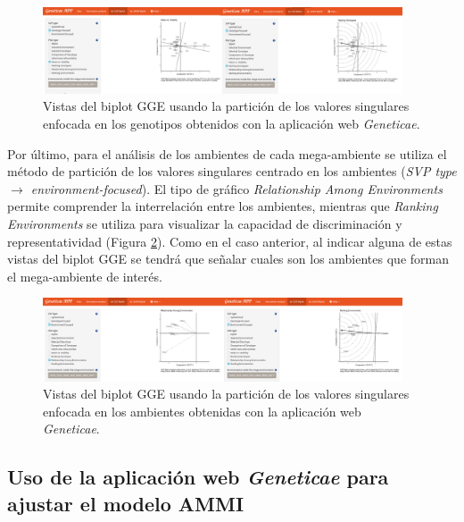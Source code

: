 \begin{figure}[h]
	\begin{center}
		\includegraphics[width=0.95\textwidth]{./Graficos/www/GGE_biplotAPP2.png}
	\end{center}
	\caption{Vistas del biplot GGE usando la partición de los valores singulares enfocada en los genotipos obtenidos con la aplicación web \emph{Geneticae}.}
	\label{fig:ggebip2}
\end{figure}

Por último, para el análisis de los ambientes de cada mega-ambiente se utiliza el método de partición de los valores singulares centrado en los ambientes (\emph{SVP type $\rightarrow$ environment-focused}). El tipo de gráfico \emph{Relationship Among Environments} permite comprender la interrelación entre los ambientes, mientras que \emph{Ranking Environments} se utiliza para visualizar la capacidad de discriminación y representatividad (Figura \ref{fig:ggebip3}). Como en el caso anterior, al indicar alguna de estas vistas del biplot GGE se tendrá que señalar cuales son los ambientes que forman el mega-ambiente de interés. 


\begin{figure}[h]
	\begin{center}
		\includegraphics[width=0.95\textwidth]{./Graficos/www/GGE_biplotAPP3.png}
	\end{center}
	\caption{Vistas del biplot GGE usando la partición de los valores singulares enfocada en los ambientes obtenidas con la aplicación web \emph{Geneticae}.}
	\label{fig:ggebip3}
\end{figure}


\subsection{Uso de la aplicación web \emph{Geneticae} para ajustar el modelo AMMI}

